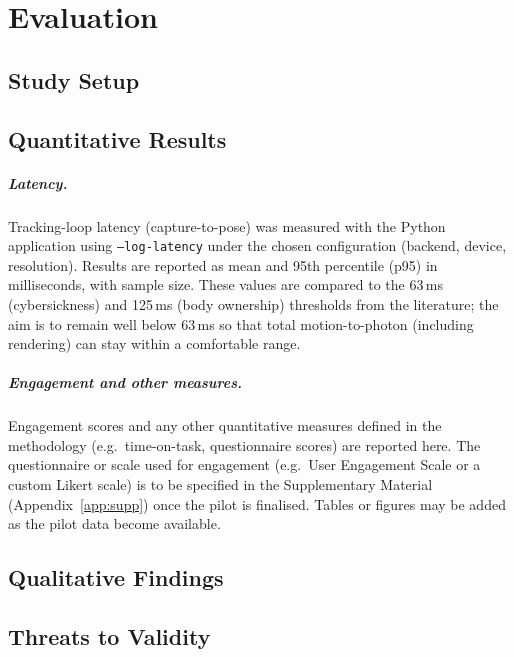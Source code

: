
\chapter{Evaluation}\label{ch:evaluation}

\section{Study Setup}

\section{Quantitative Results}

\paragraph{Latency.}
Tracking-loop latency (capture-to-pose) was measured with the Python application using \texttt{--log-latency} under the chosen configuration (backend, device, resolution). Results are reported as mean and 95th percentile (p95) in milliseconds, with sample size. These values are compared to the 63\,ms (cybersickness) and 125\,ms (body ownership) thresholds from the literature; the aim is to remain well below 63\,ms so that total motion-to-photon (including rendering) can stay within a comfortable range.

\paragraph{Engagement and other measures.}
Engagement scores and any other quantitative measures defined in the methodology (e.g.\ time-on-task, questionnaire scores) are reported here. The questionnaire or scale used for engagement (e.g.\ User Engagement Scale or a custom Likert scale) is to be specified in the Supplementary Material (Appendix~\ref{app:supp}) once the pilot is finalised. Tables or figures may be added as the pilot data become available.

\section{Qualitative Findings}

\section{Threats to Validity}
